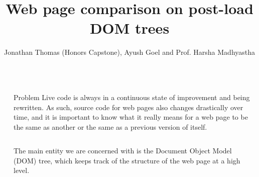 \documentclass[final]{beamer}
\title{Web page comparison on post-load DOM trees} %
\author{Jonathan Thomas (Honors Capstone), Ayush Goel and Prof. Harsha Madhyastha} %
\institute{University of Michigan} %
\newlength{\sepwid}
\newlength{\halfcolwid}
\newlength{\onecolwid}
\begin{document}

\setlength{\belowcaptionskip}{0.5ex} %
\setlength\belowdisplayshortskip{0.5ex} %

\begin{frame}[t] %

\begin{columns}[t] %

\begin{column}{\sepwid}\end{column} %

\begin{column}{\onecolwid} %


\begin{alertblock}{Problem}
Live code is always in a continuous state of improvement and being rewritten. As such, source code for web pages also changes drastically over time, and it is important to know what it really means for a web page to be the same as another or the same as a previous version of itself. 

\begin{columns}
\begin{column}{\halfcolwid}
The main entity we are concerned with is the Document Object Model (DOM) tree, which keeps track of the structure of the web page at a high level. 
\end{column}


\end{columns}
\end{alertblock}
\end{column}
\end{columns}
\end{frame}
\end{document}
